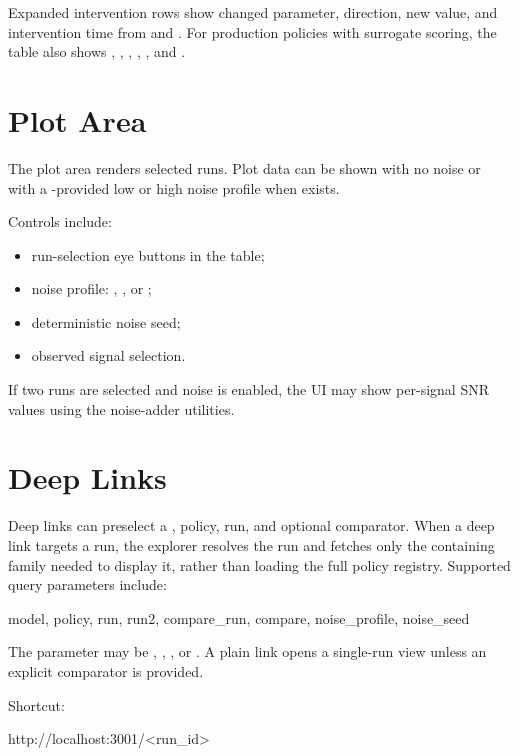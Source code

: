 \documentclass[11pt]{article}
\begin{document}
Expanded intervention rows show changed parameter, direction, new value, and intervention time from  and .
For production policies with surrogate scoring, the table also shows , , , , , and .

\section*{Plot Area}

The plot area renders selected runs.
Plot data can be shown with no noise or with a \termSimulator-provided low or high noise profile when  exists.

Controls include:

\begin{itemize}
\item run-selection eye buttons in the table;
\item noise profile: , , or ;
\item deterministic noise seed;
\item observed signal selection.
\end{itemize}

If two runs are selected and noise is enabled, the UI may show per-signal SNR values using the \termSimulator noise-adder utilities.

\section*{Deep Links}
Deep links can preselect a \termSimulator, policy, run, and optional comparator.
When a deep link targets a run, the explorer resolves the run and fetches only the containing family needed to display it, rather than loading the full policy registry.
Supported query parameters include:

\begin{DocCode}
model, policy, run, run2, compare_run, compare, noise_profile, noise_seed
\end{DocCode}

The  parameter may be , , , or .
A plain  link opens a single-run view unless an explicit comparator is provided.

Shortcut:

\begin{DocCode}
http://localhost:3001/<run_id>
\end{DocCode}
\end{document}
